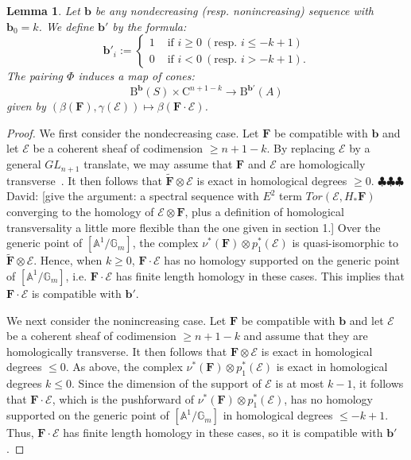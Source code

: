 \documentclass[12pt]{amsart}
\newtheorem{lemma}{Lemma}[section]
\theoremstyle{definition}
\theoremstyle{remark}
\renewcommand{\AA}{\mathbb{A}}
\newcommand{\GG}{\mathbb{G}}
\newcommand{\bb}{\mathbf{b}}
\newcommand{\cE}{\mathcal{E}}
\newcommand{\FF}{\mathbf{F}}
\newcommand{\GL}{{GL}}
\newcommand{\CQ}{\mathrm{C}}
\newcommand{\BBQ}{\mathrm{B}}
\newcommand{\david}[1]{{\color{red} \sf $\clubsuit\clubsuit\clubsuit$ David: [#1]}}
\begin{document}
\begin{lemma}\label{lem:refined positivity}
Let $\bb$ be any nondecreasing (resp. nonincreasing) sequence with $\bb_0=k$.   We define $\bb'$ by the formula:
\[
\bb'_i:=\begin{cases}
1&\text{ if } i\geq 0 \ (\text{resp. } i\leq -k+1)\\
0&\text{ if } i<0  \ (\text{resp. } i> -k+1).
\end{cases}
\]
The  pairing $\Phi$ induces a map of cones:
\[
\BBQ^{\bb}(S)\times \CQ^{n+1-k}\to \BBQ^{\bb'}(A)
\]
given by $(\beta(\FF), \gamma(\cE))\mapsto \beta(\FF\cdot \cE)$.
\end{lemma}
\begin{proof}
We first consider the nondecreasing case.  Let $\FF$ be compatible with $\bb$ and let $\cE$ be a coherent sheaf of codimension $\geq n+1-k$.  By replacing $\cE$ by a general $\GL_{n+1}$ translate, we may assume that $\FF$ and $\cE$ are homologically transverse~\cite{miller-speyer}.  It then follows that $\widetilde{\FF}\otimes \cE$ is exact in homological degrees $\geq 0$. \david{give the argument: a spectral sequence with $E^{2}$ term $Tor(\cE, H_{*} \FF)$ converging
to the homology of $\cE\otimes \FF$, plus a definition of homological transversality a little more flexible than the one given in section 1.} Over the generic point of $[\AA^1/\GG_m]$, the complex $\nu^*(\FF)\otimes p_1^*(\cE)$ is quasi-isomorphic to $\widetilde{\FF}\otimes \cE$.  Hence, when $k\geq 0$, $\FF\cdot \cE$ has no homology supported on the generic point of $[\AA^1/\GG_m]$, i.e. $\FF\cdot \cE$ has finite length homology in these cases.  This implies that $\FF\cdot \cE$ is compatible with $\bb'$.

We next consider the nonincreasing case.  Let $\FF$ be compatible with $\bb$ and let $\cE$ be a coherent sheaf of codimension $\geq n+1-k$ and assume that they are homologically transverse.  It then follows that $\FF\otimes \cE$ is exact in homological degrees $\leq 0$.
As above, the complex $\nu^*(\FF)\otimes p_1^*(\cE)$ is exact in homological degrees $k\leq 0$.  Since the dimension of the support of $\cE$ is at most $k-1$, it follows that $\FF\cdot \cE$, which is the pushforward of $\nu^*(\FF)\otimes p_1^*(\cE)$, has no homology supported on the generic point of $[\AA^1/\GG_m]$ in homological degrees $\leq -k+1$.  Thus, $\FF\cdot \cE$ has finite length homology in these cases, so it is compatible with $\bb'$.
\end{proof}
\end{document}
